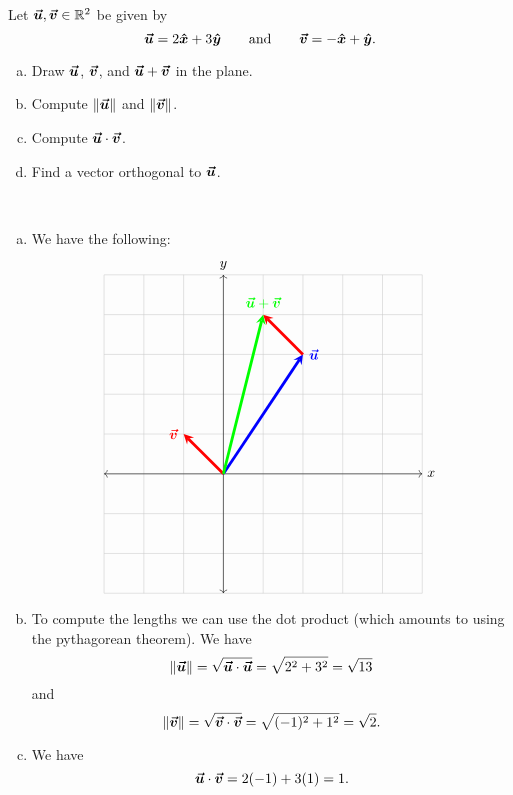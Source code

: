 \documentclass[12pt]{article} %
\begin{document}
\newpage
\begin{problem}
Let $\boldsymbol{\boldsymbol{\vec{u}}},\boldsymbol{\boldsymbol{\vec{v}}}\in \mathbb{R}^2$ be given by
\[
\boldsymbol{\boldsymbol{\vec{u}}} = 2\boldsymbol{\hat{x}} + 3 \boldsymbol{\hat{y}} \qquad \textrm{and} \qquad \boldsymbol{\boldsymbol{\vec{v}}} = -\boldsymbol{\hat{x}} +\boldsymbol{\hat{y}}.
\]
\begin{enumerate}[(a)]
    \item Draw $\boldsymbol{\boldsymbol{\vec{u}}}$, $\boldsymbol{\boldsymbol{\vec{v}}}$, and $\boldsymbol{\boldsymbol{\vec{u}}} + \boldsymbol{\boldsymbol{\vec{v}}}$ in the plane.
    \item Compute $\|\boldsymbol{\boldsymbol{\vec{u}}}\|$ and $\|\boldsymbol{\boldsymbol{\vec{v}}}\|$.
    \item Compute $\boldsymbol{\boldsymbol{\vec{u}}} \cdot \boldsymbol{\boldsymbol{\vec{v}}}$.
    \item Find a vector orthogonal to $\boldsymbol{\boldsymbol{\vec{u}}}$.
\end{enumerate}
\end{problem}
\begin{solution}~
    \begin{enumerate}[(a)]
        \item We have the following:
        \[
        \begin{tikzpicture}
        \draw[thin,gray!40] (-3,-3) grid (5,5);
        \draw[<->] (-3,0)--(5,0) node[right]{$x$};
        \draw[<->] (0,-3)--(0,5) node[above]{$y$};
        \draw[line width=2pt,blue,-stealth](0,0)--(2,3) node[anchor=west] at (2,3){$\vecu$};
        \draw[line width=2pt, red, -stealth](0,0)--(-1,1) node[anchor=east] at (-1,1){$\vecv$};
        \draw[line width=2pt, red, -stealth](2,3)--(1,4) node[anchor=north] at (1,4){};
        \draw[line width=2pt, green, -stealth](0,0)--(1,4) node[anchor=south] at (1,4){$\vecu+\vecv$};
        \end{tikzpicture}
        \]

        \item To compute the lengths we can use the dot product (which amounts to using the pythagorean theorem).  We have
        \[
            \|\boldsymbol{\boldsymbol{\vec{u}}}\| = \sqrt{\boldsymbol{\boldsymbol{\vec{u}}} \cdot \boldsymbol{\boldsymbol{\vec{u}}}} = \sqrt{2^2 + 3^2} = \sqrt{13}
        \]
        and
        \[
            \|\boldsymbol{\boldsymbol{\vec{v}}}\| = \sqrt{\boldsymbol{\boldsymbol{\vec{v}}} \cdot \boldsymbol{\boldsymbol{\vec{v}}}} = \sqrt{(-1)^2 + 1^2} = \sqrt{2}.
        \]

        \item We have
        \[
            \boldsymbol{\boldsymbol{\vec{u}}} \cdot \boldsymbol{\boldsymbol{\vec{v}}} = 2(-1)+3(1) = 1.
        \]
        

\end{enumerate}
\end{solution}
\end{document}
